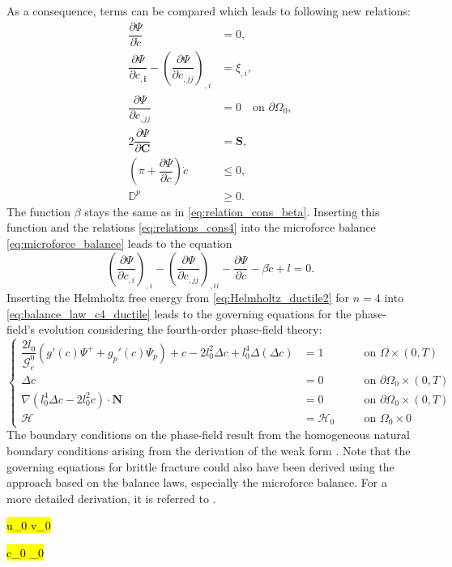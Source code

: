 As a consequence, terms can be compared which leads to following new relations:
\begin{equation} \label{eq:relations_cons4}
	\begin{aligned}
		\dfrac{\partial\Psi}{\partial\dot{c}} &= 0, \\
		\dfrac{\partial\Psi}{\partial c_{,\mathbf{i}}} -\left(\dfrac{\partial\Psi}{\partial c_{,jj}}\right)_{,i} &= \xi_{,i}, \\
		\dfrac{\partial\Psi}{\partial c_{,jj}} &= 0 \quad \text{on } \partial\Omega_{0}, \\
		2\dfrac{\partial\Psi}{\partial\mathbf{C}} &= \mathbf{S}, \\
		\left(\pi+\dfrac{\partial\Psi}{\partial c}\right)\dot{c} &\leq 0, \\
		\mathbb{D}^{p} &\geq 0.
	\end{aligned}
\end{equation}
The function $\beta$ stays the same as in \eqref{eq:relation_cons_beta}. Inserting this function and the relations \eqref{eq:relations_cons4} into the microforce balance \eqref{eq:microforce_balance} leads to the equation
\begin{equation} \label{eq:balance_law_c4_ductile}
	\left(\dfrac{\partial\Psi}{\partial c_{,i}}\right)_{,i}-\left(\dfrac{\partial\Psi}{\partial c_{,jj}}\right)_{,ii}-\dfrac{\partial\Psi}{\partial c}-\beta\dot{c}+l=0.
\end{equation}
Inserting the Helmholtz free energy from \eqref{eq:Helmholtz_ductile2} for $n=4$ into \eqref{eq:balance_law_c4_ductile} leads to the governing equations for the phase-field's evolution considering the fourth-order phase-field theory:
\begin{equation} \label{eq:c4_equil_ductile}
	\left\{\begin{alignedat}{2}
		\dfrac{2l_{0}}{\mathcal{G}_{c}^{0}}\left(g'\left(c\right)\Psi^{+}+g_{p}'\left(c\right)\Psi_{p}\right) + c - 2l_{0}^{2}\Delta c +l_{0}^{4}\Delta\left(\Delta c\right) &= 1 && \quad\text{on } \Omega\times\left(0,T\right) \\
		\Delta c &= 0 && \quad \text{on } \partial\Omega_{0}\times\left(0,T\right) \\
		\nabla\left(l_{0}^{4}\Delta c-2l_{0}^{2}c\right)\cdot\mathbf{N} &= 0 && \quad \text{on } \partial\Omega_{0}\times\left(0,T\right) \\
\mathcal{H} &= \mathcal{H}_{0} && \quad \text{on } \Omega_{0}\times0  
	\end{alignedat}\right.
\end{equation}
The boundary conditions on the phase-field result from the homogeneous natural boundary conditions arising from the derivation of the weak form \citep{11_PF_DissBorden}. \hl{} Note that the governing equations for brittle fracture could also have been derived using the approach based on the balance laws, especially the microforce balance. For a more detailed derivation, it is referred to \citep{11_PF_DissBorden}. 


\hl{ u_{0} \text{ } v_{0} }

\hl{ c_{0}  _{0} }
